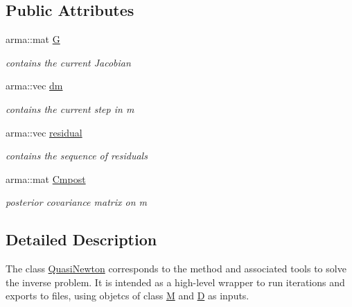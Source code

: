 \subsection*{Public Attributes}
\begin{DoxyCompactItemize}
\item 
\hypertarget{class_quasi_newton_ad74eafe14d3eef96f6cd88bac4cb358e}{}arma\+::mat \hyperlink{class_quasi_newton_ad74eafe14d3eef96f6cd88bac4cb358e}{G}\label{class_quasi_newton_ad74eafe14d3eef96f6cd88bac4cb358e}

\begin{DoxyCompactList}\small\item\em contains the current Jacobian \end{DoxyCompactList}\item 
\hypertarget{class_quasi_newton_a186725d7fd0c9aa36293ed558a1da33d}{}arma\+::vec \hyperlink{class_quasi_newton_a186725d7fd0c9aa36293ed558a1da33d}{dm}\label{class_quasi_newton_a186725d7fd0c9aa36293ed558a1da33d}

\begin{DoxyCompactList}\small\item\em contains the current step in m \end{DoxyCompactList}\item 
\hypertarget{class_quasi_newton_a31bab409e3dae8033ad24991502a470b}{}arma\+::vec \hyperlink{class_quasi_newton_a31bab409e3dae8033ad24991502a470b}{residual}\label{class_quasi_newton_a31bab409e3dae8033ad24991502a470b}

\begin{DoxyCompactList}\small\item\em contains the sequence of residuals \end{DoxyCompactList}\item 
\hypertarget{class_quasi_newton_a3631a7faba07f2d19ac2077e81995396}{}arma\+::mat \hyperlink{class_quasi_newton_a3631a7faba07f2d19ac2077e81995396}{Cmpost}\label{class_quasi_newton_a3631a7faba07f2d19ac2077e81995396}

\begin{DoxyCompactList}\small\item\em posterior covariance matrix on m \end{DoxyCompactList}\end{DoxyCompactItemize}


\subsection{Detailed Description}
The class \hyperlink{class_quasi_newton}{Quasi\+Newton} corresponds to the method and associated tools to solve the inverse problem. It is intended as a high-\/level wrapper to run iterations and exports to files, using objetcs of class \hyperlink{class_m}{M} and \hyperlink{class_d}{D} as inputs. 

